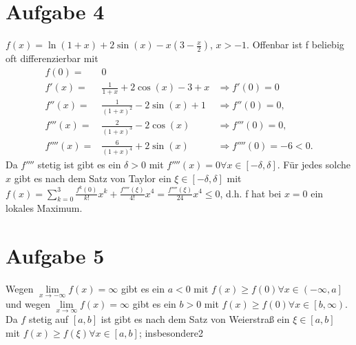 \documentclass[11pt,a4paper]{article}
\begin{document}
\begin{enumerate}[a)]
      \section*{Aufgabe 4}
        $f(x)=\ln(1+x)+2 \sin(x) - x(3-\frac{x}{2})$, $x>-1$. Offenbar ist f beliebig oft differenzierbar mit
        \begin{align*}
          f(0)=&0\\
          f'(x)=&\frac{1}{1+x}+2\cos(x)-3+x &\Rightarrow f'(0)=0\\
          f''(x)=&\frac{1}{(1+x)^2}-2\sin(x)+1 &\Rightarrow f''(0)=0,\\
          f'''(x)=&\frac{2}{(1+x)^3}-2\cos(x) &\Rightarrow f'''(0)=0,\\
          f''''(x)=&\frac{6}{(1+x)^4} + 2\sin(x) &\Rightarrow f''''(0)=-6<0.
        \end{align*}
      Da $f''''$ stetig ist gibt es ein $\delta>0$ mit $f''''(x)=0 \forall x \in \left[ -\delta,\delta \right]$. Für jedes solche $x$ gibt es nach dem Satz von Taylor ein $\xi \in \left[-\delta,\delta\right]$ mit\\
      $f(x)=\sum\limits_{k=0}^3 \frac{f^{k}(0)}{k!}x^k + \frac{f''''(\xi)}{4!}x^4 = \frac{f''''(\xi)}{24}x^4\leq 0$, d.h. f hat bei $x=0$ ein lokales Maximum.

    \section*{Aufgabe 5}
      Wegen $\lim\limits_{x\to -\infty} f(x)=\infty$ gibt es ein $a<0$ mit $f(x)\geq f(0) \forall x \in \left(-\infty,a\right]$ und wegen $\lim\limits_{x\to \infty} f(x) =\infty$ gibt es ein $b>0$ mit $f(x)\geq f(0) \forall x \in \left[ b,\infty\right)$.\\
       Da $f$ stetig auf $\left[a,b\right]$ ist gibt es nach dem Satz von Weierstraß ein $\xi \in \left[a,b\right]$ mit $f(x)\geq f(\xi) \forall x\in \left[a,b\right]$; insbesondere2


    \end{enumerate}
\end{document}
